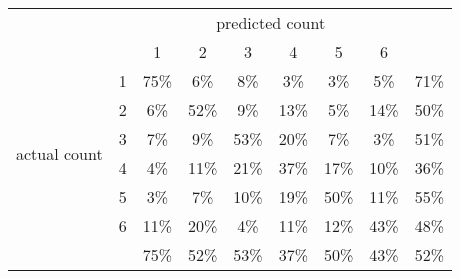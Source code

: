 
\begin{tabular}{*{9}{c}}
& & \multicolumn{6}{c}{predicted count} & \\
& & 1 & 2 & 3 & 4 & 5 & 6 & \\
\multirow{6}{*}{\begin{sideways}actual count\end{sideways}}
& 1 & \cellcolor[rgb]{0.000000,1.000000,0.000000}75\% & \cellcolor[rgb]{0.987315,0.012685,0.000000}6\% & \cellcolor[rgb]{0.967214,0.032786,0.000000}8\% & \cellcolor[rgb]{0.995154,0.004846,0.000000}3\% & \cellcolor[rgb]{0.996400,0.003600,0.000000}3\% & \cellcolor[rgb]{0.991856,0.008144,0.000000}5\% & \cellcolor[rgb]{0.000000,1.000000,0.000000}71\%\\
& 2 & \cellcolor[rgb]{0.984543,0.015457,0.000000}6\% & \cellcolor[rgb]{0.000001,0.999999,0.000000}52\% & \cellcolor[rgb]{0.960568,0.039432,0.000000}9\% & \cellcolor[rgb]{0.793233,0.206767,0.000000}13\% & \cellcolor[rgb]{0.989269,0.010731,0.000000}5\% & \cellcolor[rgb]{0.754492,0.245508,0.000000}14\% & \cellcolor[rgb]{0.000002,0.999998,0.000000}50\%\\
& 3 & \cellcolor[rgb]{0.976984,0.023016,0.000000}7\% & \cellcolor[rgb]{0.946464,0.053536,0.000000}9\% & \cellcolor[rgb]{0.000000,1.000000,0.000000}53\% & \cellcolor[rgb]{0.228780,0.771220,0.000000}20\% & \cellcolor[rgb]{0.980048,0.019952,0.000000}7\% & \cellcolor[rgb]{0.995294,0.004706,0.000000}3\% & \cellcolor[rgb]{0.000001,0.999999,0.000000}51\%\\
& 4 & \cellcolor[rgb]{0.992536,0.007464,0.000000}4\% & \cellcolor[rgb]{0.888490,0.111510,0.000000}11\% & \cellcolor[rgb]{0.154156,0.845844,0.000000}21\% & \cellcolor[rgb]{0.000336,0.999664,0.000000}37\% & \cellcolor[rgb]{0.500333,0.499667,0.000000}17\% & \cellcolor[rgb]{0.939464,0.060536,0.000000}10\% & \cellcolor[rgb]{0.000499,0.999501,0.000000}36\%\\
& 5 & \cellcolor[rgb]{0.995930,0.004070,0.000000}3\% & \cellcolor[rgb]{0.976984,0.023016,0.000000}7\% & \cellcolor[rgb]{0.934220,0.065780,0.000000}10\% & \cellcolor[rgb]{0.299381,0.700619,0.000000}19\% & \cellcolor[rgb]{0.000001,0.999999,0.000000}50\% & \cellcolor[rgb]{0.919415,0.080585,0.000000}11\% & \cellcolor[rgb]{0.000000,1.000000,0.000000}55\%\\
& 6 & \cellcolor[rgb]{0.917261,0.082739,0.000000}11\% & \cellcolor[rgb]{0.217071,0.782929,0.000000}20\% & \cellcolor[rgb]{0.994473,0.005527,0.000000}4\% & \cellcolor[rgb]{0.888730,0.111270,0.000000}11\% & \cellcolor[rgb]{0.880363,0.119637,0.000000}12\% & \cellcolor[rgb]{0.000031,0.999969,0.000000}43\% & \cellcolor[rgb]{0.000004,0.999996,0.000000}48\%\\
&   & \cellcolor[rgb]{0.000000,1.000000,0.000000}75\% & \cellcolor[rgb]{0.000001,0.999999,0.000000}52\% & \cellcolor[rgb]{0.000000,1.000000,0.000000}53\% & \cellcolor[rgb]{0.000336,0.999664,0.000000}37\% & \cellcolor[rgb]{0.000001,0.999999,0.000000}50\% & \cellcolor[rgb]{0.000031,0.999969,0.000000}43\% & \cellcolor[rgb]{0.000001,0.999999,0.000000}52\%\\
\end{tabular}
